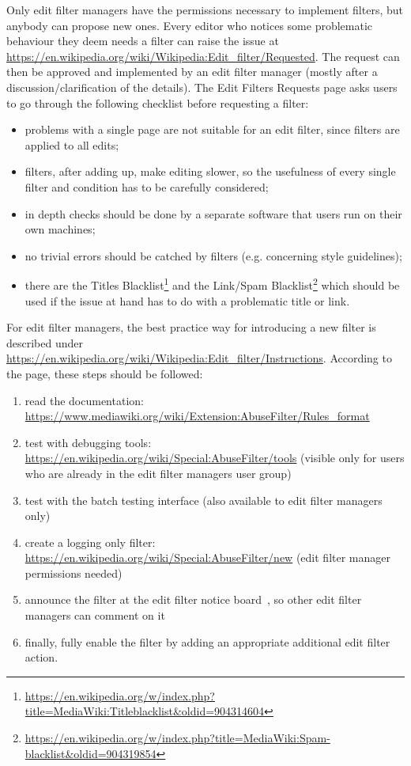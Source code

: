 Only edit filter managers have the permissions necessary to implement filters, but anybody can propose new ones.
Every editor who notices some problematic behaviour they deem needs a filter can raise the issue at \url{https://en.wikipedia.org/wiki/Wikipedia:Edit_filter/Requested}.
The request can then be approved and implemented by an edit filter manager (mostly after a discussion/clarification of the details).
The Edit Filters Requests page asks users to go through the following checklist before requesting a filter:
\begin{itemize}
    \item problems with a single page are not suitable for an edit filter, since filters are applied to all edits;
    \item filters, after adding up, make editing slower, so the usefulness of every single filter and condition has to be carefully considered;
    \item in depth checks should be done by a separate software that users run on their own machines;
    \item no trivial errors should be catched by filters (e.g. concerning style guidelines);
    \item there are the Titles Blacklist\footnote{\url{https://en.wikipedia.org/w/index.php?title=MediaWiki:Titleblacklist&oldid=904314604}} and the Link/Spam Blacklist\footnote{\url{https://en.wikipedia.org/w/index.php?title=MediaWiki:Spam-blacklist&oldid=904319854}} which should be used if the issue at hand has to do with a problematic title or link.
\end{itemize}

For edit filter managers, the best practice way for introducing a new filter is described under \url{https://en.wikipedia.org/wiki/Wikipedia:Edit_filter/Instructions}.
According to the page, these steps should be followed:
\begin{enumerate}
    \item read the documentation: \url{https://www.mediawiki.org/wiki/Extension:AbuseFilter/Rules_format}
    \item test with debugging tools: \url{https://en.wikipedia.org/wiki/Special:AbuseFilter/tools} (visible only for users who are already in the edit filter managers user group)
    \item test with the batch testing interface (also available to edit filter managers only)
    \item create a logging only filter: \url{https://en.wikipedia.org/wiki/Special:AbuseFilter/new} (edit filter manager permissions needed)
    \item announce the filter at the edit filter notice board~\cite{Wikipedia:EditFilterNoticeboard}, so other edit filter managers can comment on it
    \item finally, fully enable the filter by adding an appropriate additional edit filter action.
\end{enumerate}

